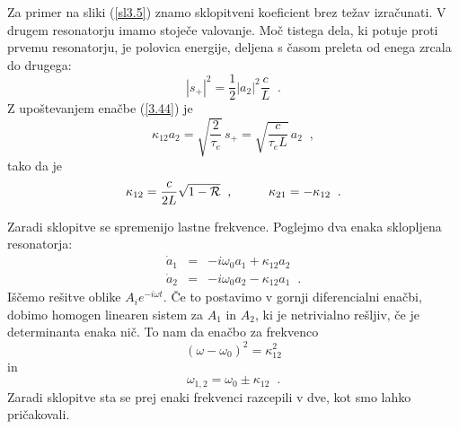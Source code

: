 Za primer na sliki (\ref{sl3.5}) znamo sklopitveni koeficient brez
težav izračunati. V drugem resonatorju imamo stoječe valovanje. Moč
tistega dela, ki potuje proti prvemu resonatorju, je polovica energije,
deljena s časom preleta od enega zrcala do drugega: 
\begin{equation}
|s_{+}|^{2}=\frac{1}{2}|a_{2}|^{2}\frac{c}{L}\;\;.\label{3.57}
\end{equation}
 Z upoštevanjem enačbe (\ref{3.44}) je 
\begin{equation}
\kappa_{12}a_{2}=\sqrt{\frac{2}{\tau_{e}}}\, s_{+}=\sqrt{\frac{c}{\tau_{e}L}}\, a_{2}\;\;,\label{3.58}
\end{equation}
 tako da je 
\begin{equation}
\kappa_{12}=\frac{c}{2L}\sqrt{1-{\cal R}}\;\;,\mbox{\hskip1cm}\kappa_{21}=-\kappa_{12}\;\;.\label{3.59}
\end{equation}

Zaradi sklopitve se spremenijo lastne frekvence. Poglejmo dva enaka
sklopljena resonatorja: 
\begin{eqnarray}
\dot{a}_{1} & = & -i\omega_{0}a_{1}+\kappa_{12}a_{2}\nonumber \\
\dot{a}_{2} & = & -i\omega_{0}a_{2}-\kappa_{12}a_{1}\;\;.
\end{eqnarray}
 Iščemo rešitve oblike $A_{i}e^{-i\omega t}$. Če to postavimo v gornji
diferencialni enačbi, dobimo homogen linearen sistem za $A_{1}$ in
$A_{2}$, ki je netrivialno rešljiv, če je determinanta enaka nič.
To nam da enačbo za frekvenco 
\begin{equation}
(\omega-\omega_{0})^{2}=\kappa_{12}^{2}\label{3.61}
\end{equation}
 in 
\begin{equation}
\omega_{1,2}=\omega_{0}\pm\kappa_{12}\;\;.\label{3.62}
\end{equation}
 Zaradi sklopitve sta se prej enaki frekvenci razcepili v dve, kot
smo lahko pričakovali.
